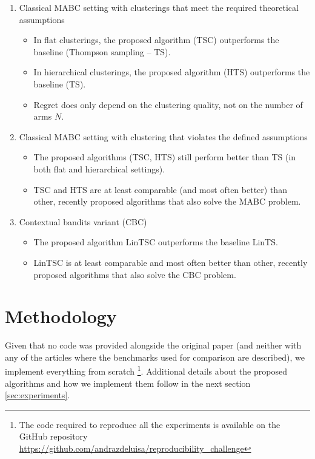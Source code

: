 \begin{enumerate}
  \item Classical MABC setting with clusterings that meet the required theoretical assumptions
        \begin{itemize}
            \item In flat clusterings, the proposed algorithm (TSC) outperforms the baseline (Thompson sampling -- TS).
            \item In hierarchical clusterings, the proposed algorithm (HTS) outperforms the baseline (TS).
            \item Regret does only depend on the clustering quality, not on the number of arms $N$.
        \end{itemize}
  \item Classical MABC setting with clustering that violates the defined assumptions
        \begin{itemize}
            \item The proposed algorithms (TSC, HTS) still perform better than TS (in both flat and hierarchical settings).
            \item TSC and HTS are at least comparable (and most often better) than other, recently proposed algorithms that also solve the MABC problem.
        \end{itemize}
  \item Contextual bandits variant (CBC)
        \begin{itemize}
            \item The proposed algorithm LinTSC outperforms the baseline LinTS.
            \item LinTSC is at least comparable and most often better than other, recently proposed algorithms that also solve the CBC problem.
        \end{itemize}
\end{enumerate}

\section{Methodology}

Given that no code was provided alongside the original paper (and neither with any of the articles where the benchmarks used for comparison are described), we implement everything from scratch \footnote{The code required to reproduce all the experiments is available on the GitHub repository \url{https://github.com/andrazdeluisa/reproducibility_challenge}}. Additional details about the proposed algorithms and how we implement them follow in the next section \ref{sec:experiments}.

